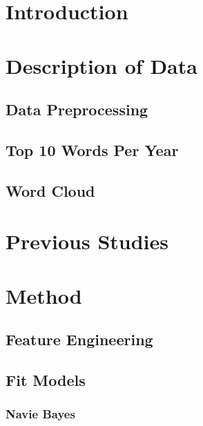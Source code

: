 \documentclass[12pt]{article}
\begin{document}
\section{Introduction} \label{sec:Intro}



\section{Description of Data} \label{sec:Descript}

\subsection{Data Preprocessing}



\subsection{Top 10 Words Per Year}



\subsection{Word Cloud}



\section{Previous Studies}


\section{Method}

\subsection{Feature Engineering}


\pagebreak

\subsection{Fit Models}
\subsubsection{Navie Bayes}

\end{document}

